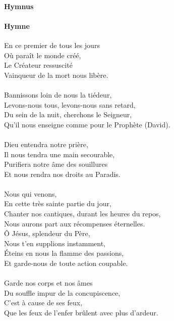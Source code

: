 \documentclass[twoside]{article}
\begin{document}
\begin{paracol}[1]{2}
\switchcolumn*

\paragraph{Hymnus}


\switchcolumn

\paragraph{Hymne}

En ce premier de tous les jours \\
Où paraît le monde créé,\\
Le Créateur ressuscité\\
Vainqueur de la mort nous libère.\\
\\
Bannissons loin de nous la tiédeur,\\
Levons-nous tous, levons-nous sans retard,\\
Du sein de la nuit, cherchons le Seigneur,\\
Qu'il nous enseigne comme pour le Prophète (David).\\
\\
Dieu entendra notre prière,\\
Il nous tendra une main secourable,\\
Purifiera notre âme des souillures\\
Et nous rendra nos droits au Paradis.\\
\\
Nous qui venons,\\
En cette très sainte partie du jour,\\
Chanter nos cantiques, durant les heures du repos,\\
Nous aurons part aux récompenses éternelles.\\
\newpage
\null\vfill
Ô Jésus, splendeur du Père,\\
Nous t'en supplions instamment,\\
Éteins en nous la flamme des passions,\\
Et garde-nous de toute action coupable.\\
\\
Garde nos corps et nos âmes\\
Du souffle impur de la concupiscence,\\
C'est à cause de ses feux,\\
Que les feux de l'enfer brûlent avec plus d'ardeur.\\

\end{paracol}
\end{document}
